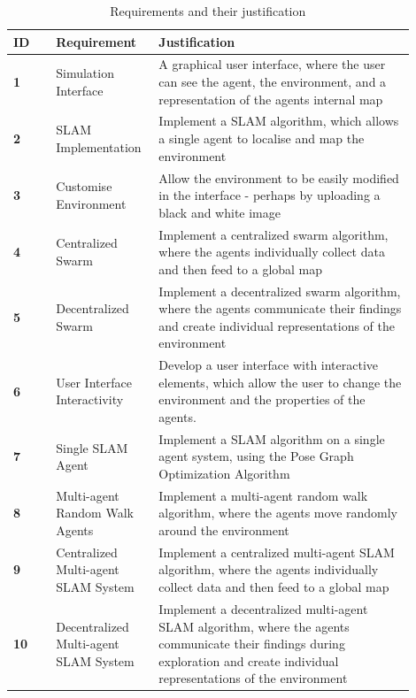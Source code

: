 \documentclass[12pt]{article}
\begin{document}
\begin{table}[H]
    \centering
    \begin{tabular}{|p{0.1\linewidth}|p{0.2\linewidth}|p{0.6\linewidth}|}
        \hline
        \textbf{ID} &
        \textbf{Requirement} &
        \textbf{Justification}\\
        \hline
        \textbf{1} &
        Simulation Interface &
        A graphical user interface, where the user can see the agent, the environment, and a representation of
            the agents internal map\\
        \hline
        \textbf{2} &
        SLAM Implementation &
        Implement a SLAM algorithm, which allows a single agent to localise and map the environment\\
        \hline
        \textbf{3} &
        Customise Environment &
        Allow the environment to be easily modified in the interface - perhaps by uploading a black and white image\\
        \hline
        \textbf{4} &
        Centralized Swarm &
        Implement a centralized swarm algorithm, where the agents individually collect data and then feed to a global map\\
        \hline
        \textbf{5} &
        Decentralized Swarm &
        Implement a decentralized swarm algorithm, where the agents communicate their findings and create individual representations
            of the environment\\
        \hline
        \textbf{6} &
        User Interface Interactivity &
        Develop a user interface with interactive elements, which allow the user to change the environment and the properties of the agents.\\
        \hline
        \textbf{7} &
        Single SLAM Agent &
        Implement a SLAM algorithm on a single agent system, using the Pose Graph Optimization Algorithm\\
        \hline
        \textbf{8} &
        Multi-agent Random Walk Agents &
        Implement a multi-agent random walk algorithm, where the agents move randomly around the environment\\
        \hline
        \textbf{9} &
        Centralized Multi-agent SLAM System &
        Implement a centralized multi-agent SLAM algorithm, where the agents individually collect data and then feed to a global map\\
        \hline
        \textbf{10} &
        Decentralized Multi-agent SLAM System &
        Implement a decentralized multi-agent SLAM algorithm, where the agents communicate their findings during exploration and create individual representations of the environment\\
        \hline
    \end{tabular}
    \caption{Requirements and their justification}\label{tab:requirements_table}
\end{table} \\
\end{document}
